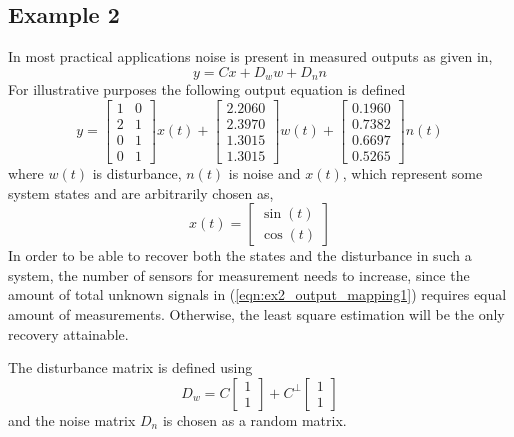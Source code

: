 \documentclass[pdflatex,sn-mathphys-num]{sn-jnl}%
\theoremstyle{thmstyleone}%
\theoremstyle{thmstyletwo}%
\theoremstyle{thmstylethree}%
\begin{document}
\subsection{Example 2}
In most practical applications noise is present in measured outputs as given in,
\begin{equation}
    y=Cx+D_w w+D_n n\label{eqn:ex2_output_mapping1}
\end{equation}
For illustrative purposes the following output equation is defined
\begin{equation}
    y=\begin{bmatrix}
    1&     0\\
    2&     1\\
    0&     1\\
    0&     1
    \end{bmatrix}x(t)+\begin{bmatrix}
        2.2060\\
        2.3970\\
        1.3015\\
        1.3015
    \end{bmatrix}w(t)+
    \begin{bmatrix}
    0.1960\\
    0.7382\\
    0.6697\\
    0.5265
    \end{bmatrix}n(t)
\end{equation}
where $w(t)$ is disturbance, $n(t)$ is noise and $x(t)$, which represent some system states and  are arbitrarily chosen as,
\begin{equation}
    x(t)=\begin{bmatrix}
        \sin(t)\\ \cos(t)
    \end{bmatrix}
\end{equation}
In order to be able to recover both the states and the disturbance in such a system, the number of sensors for measurement needs to increase, since the amount of total unknown signals in (\ref{eqn:ex2_output_mapping1}) requires equal amount of measurements. Otherwise, the least square estimation will be the only recovery attainable. 

The disturbance matrix is defined using 
\begin{equation}
    D_w=C\begin{bmatrix}1\\1\end{bmatrix}+C^\perp\begin{bmatrix}1\\1\end{bmatrix}
\end{equation}
and the noise matrix $D_n$ is chosen as a random matrix.
\end{document}
